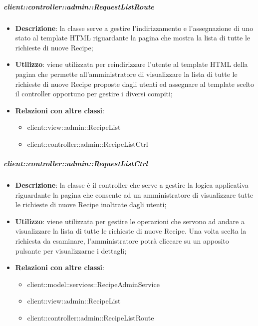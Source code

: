 		\subparagraph{client::controller::admin::RequestListRoute} %
		\label{subp:bdsm_app_client_controller_admin_recipelistroute}
			\begin{itemize}
				\item \textbf{Descrizione}: la classe serve a gestire l'indirizzamento e l'assegnazione di uno stato al template HTML riguardante la pagina che mostra la lista di tutte le richieste di nuove Recipe;
				\item \textbf{Utilizzo}: viene utilizzata per reindirizzare l'utente al template HTML della pagina che permette all'amministratore di visualizzare la lista di tutte le richieste di nuove Recipe proposte dagli utenti ed assegnare al template scelto il controller opportuno per gestire i diversi compiti;
				\item \textbf{Relazioni con altre classi}:
					\begin{itemize}
						\item client::view::admin::RecipeList
						\item client::controller::admin::RecipeListCtrl
					\end{itemize}
			\end{itemize}

		\subparagraph{client::controller::admin::RequestListCtrl} %
		\label{subp:bdsm_app_client_controller_admin_requestlistctrl}
			\begin{itemize}
				\item \textbf{Descrizione}: la classe è il controller che serve a gestire la logica applicativa riguardante la pagina che consente ad un amministratore di visualizzare tutte le richieste di nuove Recipe inoltrate dagli utenti;
				\item \textbf{Utilizzo}: viene utilizzata per gestire le operazioni che servono ad andare a visualizzare la lista di tutte le richieste di nuove Recipe. Una volta scelta la richiesta da esaminare, l'amministratore potrà cliccare su un apposito pulsante per visualizzarne i dettagli;
				\item \textbf{Relazioni con altre classi}:
					\begin{itemize}
						\item client::model::services::RecipeAdminService
						\item client::view::admin::RecipeList
						\item client::controller::admin::RecipeListRoute
					\end{itemize}
			\end{itemize}

